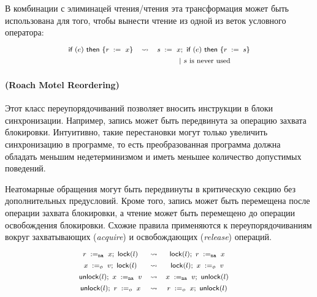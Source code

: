 В комбинации с элиминацей чтения/чтения 
эта трансформация может быть использована 
для того, чтобы вынести чтение из 
одной из веток условного оператора:
%
\[\def\arraystretch{1.4}\footnotesize
  \begin{array}{ccc} 

      \kw{if} (e)~ \kw{then} \{ \readInst{}{r}{x} \}
    & \leadsto 
    & \readInst{}{s}{x} \seq \kw{if} (e)~ \kw{then} \{ \assignInst{r}{s} \} \\
    & & ~|~ \text{$s$ is never used}  \\ 

  \end{array}
\]

\paragraph{
(Roach Motel Reordering)
}

Этот класс переупорядочиваний позволяет 
вносить инструкции в блоки синхронизации. 
Например, запись может быть передвинута 
за операцию захвата блокировки. 
Интуитивно, такие перестановки могут 
только увеличить синхронизацию в программе, 
то есть преобразованная программа 
должна обладать меньшим недетерминизмом 
и иметь меньшее количество допустимых поведений. 

Неатомарные обращения могут быть передвинуты 
в критическую секцию без дополнительных предусловий. 
Кроме того, запись может быть перемещена после 
операции захвата блокировки, а чтение 
может быть перемещено до операции освобождения блокировки. 
Схожие правила применяются к переупорядочиваниям вокруг 
захватывающих (\emph{acquire}) и освобождающих (\emph{release}) операций. 
\[\def\arraystretch{1.4}\footnotesize
  \begin{array}{cccl} 

      \readInst{\na}{r}{x} \seq \lockInst{l} 
    & \leadsto 
    & \lockInst{l} \seq \readInst{\na}{r}{x}
    & ~ \\ 

      \writeInst{o}{x}{v} \seq \lockInst{l} 
    & \leadsto 
    & \lockInst{l} \seq \writeInst{o}{x}{v}
    & ~  \\ 

      \unlockInst{l} \seq \writeInst{\na}{x}{v} 
    & \leadsto 
    & \writeInst{\na}{x}{v} \seq \unlockInst{l}
    & ~ \\ 


      \unlockInst{l} \seq \readInst{o}{r}{x} 
    & \leadsto 
    & \readInst{o}{r}{x} \seq \unlockInst{l}
    & ~  \\ 

  \end{array}
\]


